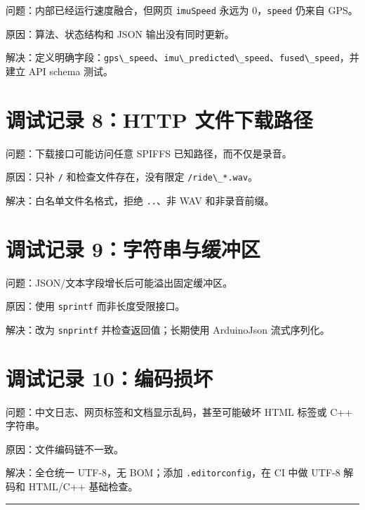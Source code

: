 \documentclass[
  UTF8,11pt,a4paper]{ctexart}
\newcommand{\passthrough}[1]{#1}
\begin{document}
问题：内部已经运行速度融合，但网页 \passthrough{\lstinline!imuSpeed!}
永远为 0，\passthrough{\lstinline!speed!} 仍来自 GPS。

原因：算法、状态结构和 JSON 输出没有同时更新。

解决：定义明确字段：\passthrough{\lstinline!gps\_speed!}、\passthrough{\lstinline!imu\_predicted\_speed!}、\passthrough{\lstinline!fused\_speed!}，并建立
API schema 测试。

\section{调试记录 8：HTTP
文件下载路径}\label{ux8c03ux8bd5ux8bb0ux5f55-8http-ux6587ux4ef6ux4e0bux8f7dux8defux5f84}

问题：下载接口可能访问任意 SPIFFS 已知路径，而不仅是录音。

原因：只补 \passthrough{\lstinline!/!} 和检查文件存在，没有限定
\passthrough{\lstinline!/ride\_*.wav!}。

解决：白名单文件名格式，拒绝 \passthrough{\lstinline!..!}、非 WAV
和非录音前缀。

\section{调试记录
9：字符串与缓冲区}\label{ux8c03ux8bd5ux8bb0ux5f55-9ux5b57ux7b26ux4e32ux4e0eux7f13ux51b2ux533a}

问题：JSON/文本字段增长后可能溢出固定缓冲区。

原因：使用 \passthrough{\lstinline!sprintf!} 而非长度受限接口。

解决：改为 \passthrough{\lstinline!snprintf!} 并检查返回值；长期使用
ArduinoJson 流式序列化。

\section{调试记录
10：编码损坏}\label{ux8c03ux8bd5ux8bb0ux5f55-10ux7f16ux7801ux635fux574f}

问题：中文日志、网页标签和文档显示乱码，甚至可能破坏 HTML 标签或 C++
字符串。

原因：文件编码链不一致。

解决：全仓统一 UTF-8，无 BOM；添加
\passthrough{\lstinline!.editorconfig!}，在 CI 中做 UTF-8 解码和
HTML/C++ 基础检查。

\begin{center}\rule{0.5\linewidth}{0.5pt}\end{center}
\end{document}
